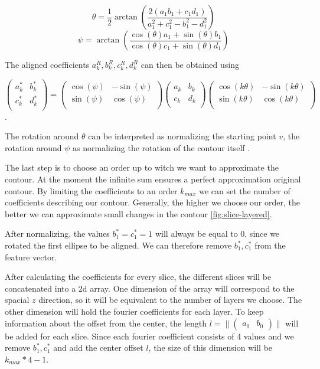 $$
\theta = \frac{1}{2}\arctan \left( \frac{2(a_1b_1 + c_1d_1)}{a_1^2 + c_1^2 - b_1^2 - d_1^2} \right)
$$
$$
\psi = \arctan \left( \frac{\cos(\theta) a_1 + \sin(\theta) b_1 }{\cos(\theta) c_1 + \sin(\theta) d_1} \right)
$$

The aligned coefficients $a_k^R, b_k^R, c_k^R, d_k^R$ can then be obtained using

$$
\begin{pmatrix}
  a_k^* & b_k^* \\
  c_k^* & d_k^* \\
\end{pmatrix}
=
\begin{pmatrix}
  \cos(\psi) & -\sin(\psi) \\
  \sin(\psi) & \cos(\psi) \\
\end{pmatrix}
\begin{pmatrix}
  a_k & b_k \\
  c_k & d_k \\
\end{pmatrix}
\begin{pmatrix}
  \cos(k\theta ) & -\sin(k\theta) \\
  \sin(k\theta) & \cos(k\theta) \\
\end{pmatrix}
$$.

The rotation around $\theta $ can be interpreted as normalizing the starting point $v$, 
the rotation around $\psi$ as normalizing the rotation of the contour itself \cite{KUHL1982236}.

The last step is to choose an order up to witch we want to approximate the contour.
At the moment the infinite sum ensures a perfect approximation original contour. 
By limiting the coefficients to an order $k_{max}$ we can set the number of coefficients describing our contour.
Generally, the higher we choose our order, the better we can approximate small changes in the contour \ref{fig:slice-layered}.

After normalizing, the values $b_1^* = c_1^* = 1$ will always be equal to 0, since we rotated the first ellipse to be aligned.
We can therefore remove $b_1^*, c_1^*$ from the feature vector.

After calculating the coefficients for every slice, the different slices will be concatenated into a 2d array.
One dimension of the array will correspond to the spacial $z$ direction, so it will be equivalent to the number of layers we choose.
The other dimension will hold the fourier coefficients for each layer.
To keep information about the offset from the center, the length $l = \| \begin{pmatrix} a_0 & b_0 \end{pmatrix} \| $ will be added for each slice.
Since each fourier coefficient consists of 4 values and we remove $b_1^*, c_1^*$ and add the center offset $l$, the size of this dimension will be $k_{max} * 4 - 1$.


